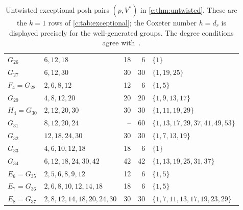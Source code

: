 \documentclass[10pt,a4paper]{amsart}
\theoremstyle{definition}
\begin{document}
\begin{table}[htbp]
\begin{tabular}{@{}lL{.31\textwidth}rrL{.25\textwidth}@{}}
$G_{26}$ & $6,\allowbreak 12,\allowbreak 18$ & 18 & 6 & $\{1\}$ \\
$G_{27}$ & $6,\allowbreak 12,\allowbreak 30$ & 30 & 30 & $\{1,\allowbreak 19,\allowbreak 25\}$ \\
$F_4=G_{28}$ & $2,\allowbreak 6,\allowbreak 8,\allowbreak 12$ & 12 & 6 & $\{1,\allowbreak 5\}$ \\
$G_{29}$ & $4,\allowbreak 8,\allowbreak 12,\allowbreak 20$ & 20 & 20 & $\{1,\allowbreak 9,\allowbreak 13,\allowbreak 17\}$ \\
$H_4=G_{30}$ & $2,\allowbreak 12,\allowbreak 20,\allowbreak 30$ & 30 & 30 & $\{1,\allowbreak 11,\allowbreak 19,\allowbreak 29\}$ \\
$G_{31}$ & $8,\allowbreak 12,\allowbreak 20,\allowbreak 24$ & -- & 60 & $\{1,\allowbreak 13,\allowbreak 17,\allowbreak 29,\allowbreak 37,\allowbreak 41,\allowbreak 49,\allowbreak 53\}$ \\
$G_{32}$ & $12,\allowbreak 18,\allowbreak 24,\allowbreak 30$ & 30 & 30 & $\{1,\allowbreak 7,\allowbreak 13,\allowbreak 19\}$ \\
$G_{33}$ & $4,\allowbreak 6,\allowbreak 10,\allowbreak 12,\allowbreak 18$ & 18 & 6 & $\{1\}$ \\
$G_{34}$ & $6,\allowbreak 12,\allowbreak 18,\allowbreak 24,\allowbreak 30,\allowbreak 42$ & 42 & 42 & $\{1,\allowbreak 13,\allowbreak 19,\allowbreak 25,\allowbreak 31,\allowbreak 37\}$ \\
$E_6=G_{35}$ & $2,\allowbreak 5,\allowbreak 6,\allowbreak 8,\allowbreak 9,\allowbreak 12$ & 12 & 6 & $\{1,\allowbreak 5\}$ \\
$E_7=G_{36}$ & $2,\allowbreak 6,\allowbreak 8,\allowbreak 10,\allowbreak 12,\allowbreak 14,\allowbreak 18$ & 18 & 6 & $\{1,\allowbreak 5\}$ \\
$E_8=G_{37}$ & $2,\allowbreak 8,\allowbreak 12,\allowbreak 14,\allowbreak 18,\allowbreak 20,\allowbreak 24,\allowbreak 30$ & 30 & 30 & $\{1,\allowbreak 7,\allowbreak 11,\allowbreak 13,\allowbreak 17,\allowbreak 19,\allowbreak 23,\allowbreak 29\}$ \\
\bottomrule
\end{tabular}
\caption{Untwisted exceptional posh pairs $(p,V^*)$ in \cref{c:thm:untwisted}. These are the $k=1$ rows of \cref{c:tab:exceptional}; the Coxeter number $h=d_r$ is displayed precisely for the well-generated groups. The degree conditions agree with~\cite[Table 1]{IO}.}\label{tab:exceptional-untwisted}
\end{table}
\endgroup

\clearpage
\end{document}
